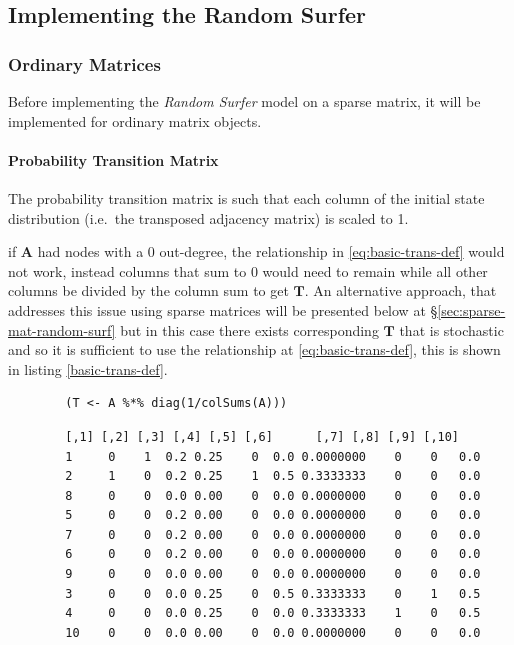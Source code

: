 \documentclass[11pt, twoside]{report}
\begin{document}
\subsection{Implementing the Random Surfer}
\label{sec:orgb756c9c}
\subsubsection{Ordinary Matrices}
\label{implementing-page-rank-methods}
Before implementing the \textit{Random Surfer} model on a sparse matrix, it will
be implemented for ordinary matrix objects.
\paragraph{Probability Transition Matrix}
\label{probability-transition-matrix}
The probability transition matrix is such that each column of the
initial state distribution (i.e. the transposed adjacency matrix) is
scaled to 1.

if \(\mathbf{A}\) had nodes with a 0 out-degree, the relationship in
\eqref{eq:basic-trans-def} would not work, instead columns that sum to 0 would
need to remain while all other columns be divided by the column sum to get
\(\mathbf{T}\). An alternative approach, that addresses this issue using sparse
matrices will be presented below at \S \ref{sec:sparse-mat-random-surf} but in
this case there exists corresponding \(\mathbf{T}\) that is stochastic and so it
is sufficient to use the relationship at \eqref{eq:basic-trans-def}, this is
shown in listing \ref{basic-trans-def}.

\begin{listing}[htbp]
    \begin{tcolorbox}
        \begin{verbatim}
        (T <- A %*% diag(1/colSums(A)))
        \end{verbatim}
        \caption{\label{basic-trans-def}Solve the Transition Probability Matrix by scaling each column to 1 using matrix multiplication.}
    \tcblower
        \begin{verbatim}
        [,1] [,2] [,3] [,4] [,5] [,6]      [,7] [,8] [,9] [,10]
        1     0    1  0.2 0.25    0  0.0 0.0000000    0    0   0.0
        2     1    0  0.2 0.25    1  0.5 0.3333333    0    0   0.0
        8     0    0  0.0 0.00    0  0.0 0.0000000    0    0   0.0
        5     0    0  0.2 0.00    0  0.0 0.0000000    0    0   0.0
        7     0    0  0.2 0.00    0  0.0 0.0000000    0    0   0.0
        6     0    0  0.2 0.00    0  0.0 0.0000000    0    0   0.0
        9     0    0  0.0 0.00    0  0.0 0.0000000    0    0   0.0
        3     0    0  0.0 0.25    0  0.5 0.3333333    0    1   0.5
        4     0    0  0.0 0.25    0  0.0 0.3333333    1    0   0.5
        10    0    0  0.0 0.00    0  0.0 0.0000000    0    0   0.0
        \end{verbatim}
    \end{tcolorbox}
\end{listing}
\end{document}

